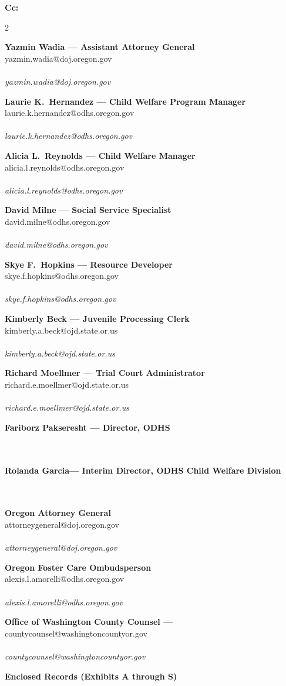 \documentclass[10pt,a4paper,roman]{moderncv}
\newcommand{\recip}[2]{\textbf{#1}\ifx\\#2\\\else\\[1pt]{\scriptsize\itshape #2}\fi\par\medskip}
\begin{document}
	\noindent\textbf{Cc:}\par
	\setlength{\columnsep}{1.5em}
	\begin{multicols}{2}
		\raggedright\setlength{\parindent}{0pt}
		\recip{Yazmin Wadia --- Assistant Attorney General}{yazmin.wadia@doj.oregon.gov}
		\recip{Laurie K.~Hernandez --- Child Welfare Program Manager}{laurie.k.hernandez@odhs.oregon.gov}
		\recip{Alicia L.~Reynolds --- Child Welfare Manager}{alicia.l.reynolds@odhs.oregon.gov}
		\recip{David Milne --- Social Service Specialist}{david.milne@odhs.oregon.gov}
		\recip{Skye F.~Hopkins --- Resource Developer}{skye.f.hopkins@odhs.oregon.gov}
		\columnbreak
		\recip{Kimberly Beck --- Juvenile Processing Clerk}{kimberly.a.beck@ojd.state.or.us}
		\recip{Richard Moellmer --- Trial Court Administrator}{richard.e.moellmer@ojd.state.or.us}
		\recip{Fariborz Pakseresht --- Director, ODHS}{}
		\recip{Rolanda Garcia--- Interim Director, ODHS Child Welfare Division}{}
		\recip{Oregon Attorney General}{attorneygeneral@doj.oregon.gov}
		\recip{Oregon Foster Care Ombudsperson}{alexis.l.amorelli@odhs.oregon.gov}
		\recip{Office of Washington County Counsel --- }{countycounsel@washingtoncountyor.gov}
	\end{multicols}
	\vspace{1.0em}
	\normalsize
	\begin{center}
		\textbf{Enclosed Records (Exhibits A through S)}
	\end{center}
\end{document}
